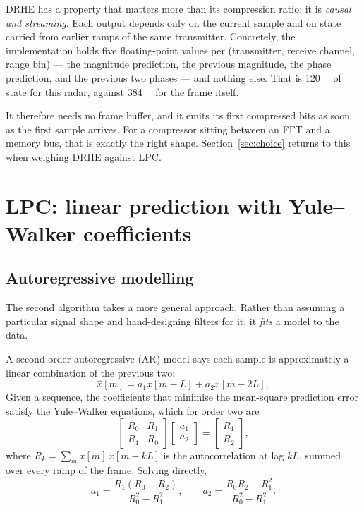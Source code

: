 DRHE has a property that matters more than its compression ratio: it is
\emph{causal and streaming}. Each output depends only on the current sample and
on state carried from earlier ramps of the same transmitter. Concretely, the
implementation holds five floating-point values per (transmitter, receive
channel, range bin) --- the magnitude prediction, the previous magnitude, the
phase prediction, and the previous two phases --- and nothing else. That is
\SI{120}{\kibi\byte} of state for this radar, against \SI{384}{\kibi\byte} for
the frame itself.

It therefore needs no frame buffer, and it emits its first compressed bits as
soon as the first sample arrives. For a compressor sitting between an FFT and a
memory bus, that is exactly the right shape. Section~\ref{sec:choice}
returns to this when weighing DRHE against LPC.


\section{LPC: linear prediction with Yule--Walker coefficients}
\label{sec:lpc}

\subsection{Autoregressive modelling}

The second algorithm takes a more general approach. Rather than assuming a
particular signal shape and hand-designing filters for it, it \emph{fits} a
model to the data.

A second-order autoregressive (AR) model says each sample is approximately a
linear combination of the previous two:
\begin{equation}
\label{eq:ar2}
\hat{x}[m] = a_1 x[m-L] + a_2 x[m-2L],
\end{equation}
Given a sequence, the coefficients that minimise the mean-square prediction
error satisfy the Yule--Walker equations, which for order two are
\begin{equation}
\begin{bmatrix} R_0 & R_1 \\ R_1 & R_0 \end{bmatrix}
\begin{bmatrix} a_1 \\ a_2 \end{bmatrix}
=
\begin{bmatrix} R_1 \\ R_2 \end{bmatrix},
\end{equation}
where $R_k = \sum_m x[m]\,x[m-kL]$ is the autocorrelation at lag $kL$, summed
over every ramp of the frame. Solving
directly,
\begin{equation}
\label{eq:yw}
a_1 = \frac{R_1(R_0 - R_2)}{R_0^2 - R_1^2},
\qquad
a_2 = \frac{R_0 R_2 - R_1^2}{R_0^2 - R_1^2}.
\end{equation}

